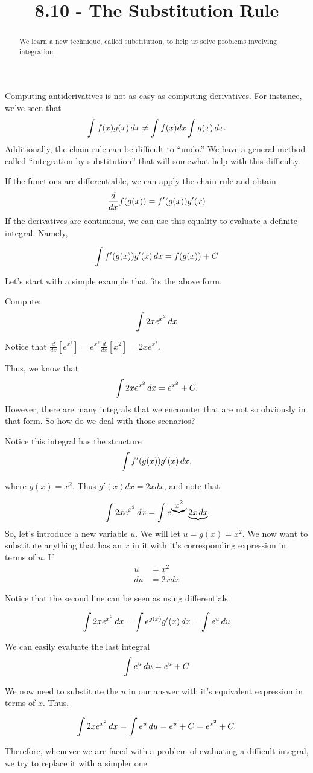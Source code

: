 \documentclass{ximera}
\title{8.10 - The Substitution Rule}
\begin{document}
\begin{abstract}
  We learn a new technique, called substitution, to help us solve
  problems involving integration.
\end{abstract}
\maketitle


Computing antiderivatives is not as easy as computing derivatives. For instance, we've seen that 
\[\int f(x)g(x)\mathop{}\!d x \neq \int f(x)dx\int g(x)\mathop{}\!d x.
\]
Additionally, the chain rule can be difficult to ``undo.''  We
have a general method called ``integration by substitution'' that will
somewhat help with this difficulty. 

If the functions are differentiable, we can apply the chain rule and obtain
\[
\frac{d}{\mathop{}\!d x} f(g(x)) = f'(g(x))g'(x)
\]
If the derivatives are continuous, we can use this equality to evaluate a definite integral. Namely,

 \[ \int f'(g(x))g'(x) \mathop{}\!d x = {f(g(x))}+C \]

Let's start with a simple example that fits the above form.
\begin{example}
Compute:
\[
\int 2x e^{x^2}\mathop{}\!d x
\]
\begin{explanation}
Notice that $\frac{d}{dx}\left[e^{x^2}\right]=e^{x^2}\frac{d}{dx}\left[x^2\right]=2xe^{x^2}$.

Thus, we know that 
\[
\int 2x e^{x^2}\mathop{}\!d x=e^{x^2}+C.
\]
However, there are many integrals that we encounter that are not so obviously in that form. So how do we deal with those scenarios?

Notice this integral has the structure
\[
\int f'(g(x)) g'(x) \mathop{}\!d x ,  
\]


where $g(x) =x^2$. Thus $g'(x)dx =2xdx$, and note that

\[
\int 2x e^{x^2}\mathop{}\!d x
=\int e^{\underbrace{x^2}}\underbrace{2x\mathop{}\!d x}
\]
So, let's introduce a new variable $u$. We will let $u=g(x)=x^2$. We now want to substitute anything that has an $x$ in it with it's corresponding expression in terms of $u$.
If 
\begin{align*}
    u&=x^2\\
    du&=2xdx
\end{align*}

Notice that the second line can be seen as using differentials.


\[
\int 2x e^{x^2}\mathop{}\!d x=\int e^{g(x)}g'(x)\mathop{}\!d x=\int e^{u}\mathop{}\!d u
\]

We can easily evaluate the last integral
\[
\int e^{u}\mathop{}\!d u= e^u+C
\]

We now need to substitute the $u$ in our answer with it's equivalent expression in terms of $x$. 
Thus,

\[
\int 2x e^{x^2}\mathop{}\!d x=\int e^{u}\mathop{}\!d u=e^u+C=e^{x^2}+C.
\]

Therefore, whenever we are faced with a problem of evaluating a difficult integral, we try to  replace it with  a simpler one.


\end{explanation}
\end{example}
\end{document}
